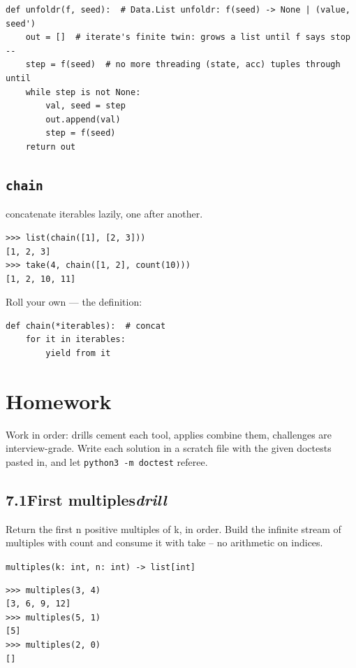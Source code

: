 \documentclass[10pt,letterpaper]{book}
\begin{document}
\begin{lstlisting}[style=ex]
def unfoldr(f, seed):  # Data.List unfoldr: f(seed) -> None | (value, seed')
    out = []  # iterate's finite twin: grows a list until f says stop --
    step = f(seed)  # no more threading (state, acc) tuples through until
    while step is not None:
        val, seed = step
        out.append(val)
        step = f(seed)
    return out
\end{lstlisting}

\subsection{\texttt{chain}}\label{def:chain}
concatenate iterables lazily, one after another.
\begin{lstlisting}[style=ex]
>>> list(chain([1], [2, 3]))
[1, 2, 3]
>>> take(4, chain([1, 2], count(10)))
[1, 2, 10, 11]
\end{lstlisting}

Roll your own --- the definition:

\begin{lstlisting}[style=ex]
def chain(*iterables):  # concat
    for it in iterables:
        yield from it
\end{lstlisting}

\section{Homework}
Work in order: drills cement each tool, applies combine them,
challenges are interview-grade. Write each solution in a scratch file with
the given doctests pasted in, and let \texttt{python3 -m doctest} referee.
\subsection*{7.1\quad First multiples\hfill\textnormal{\textit{drill}}}
Return the first n positive multiples of k, in order. Build the infinite stream of multiples with count and consume it with take -- no arithmetic on indices.

\noindent\texttt{multiples(k: int, n: int) -> list[int]}
\begin{lstlisting}[style=ex]
>>> multiples(3, 4)
[3, 6, 9, 12]
>>> multiples(5, 1)
[5]
>>> multiples(2, 0)
[]
\end{lstlisting}
\end{document}
